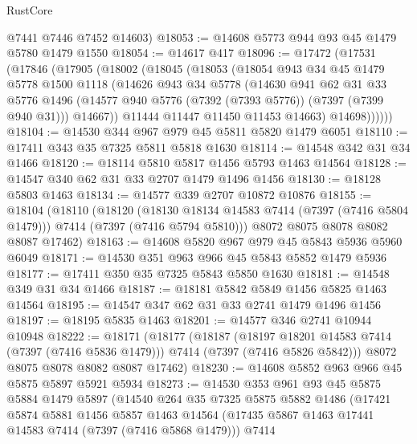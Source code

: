 \begin{lexlean}{RustCore}
\begin{coremodule}
      @7441
      @7446
      @7452
      @14603)
@18053 := @14608 @5773 @944 @93 @45 @1479 @5780 @1479 @1550
@18054 := @14617 @417
@18096 := @17472
    (@17531
      (@17846
        (@17905
          (@18002
            (@18045
              (@18053
                (@18054
                  @943
                  @34
                  @45
                  @1479
                  @5778
                  @1500
                  @1118
                  (@14626
                    @943
                    @34
                    @5778
                    (@14630
                      @941
                      @62
                      @31
                      @33
                      @5776
                      @1496
                      (@14577 @940 @5776 (@7392 (@7393 @5776)) (@7397 (@7399 @940 @31)))
                      @14667))
                  @11444
                  @11447
                  @11450
                  @11453
                  @14663)
                @14698))))))
@18104 := @14530 @344 @967 @979 @45 @5811 @5820 @1479 @6051
@18110 := @17411 @343 @35 @7325 @5811 @5818 @1630
@18114 := @14548 @342 @31 @34 @1466
@18120 := @18114 @5810 @5817 @1456 @5793 @1463 @14564
@18128 := @14547 @340 @62 @31 @33 @2707 @1479 @1496 @1456
@18130 := @18128 @5803 @1463
@18134 := @14577 @339 @2707 @10872 @10876
@18155 := @18104
    (@18110
      (@18120
        (@18130 @18134 @14583 @7414 (@7397 (@7416 @5804 @1479)))
        @7414
        (@7397 (@7416 @5794 @5810)))
      @8072
      @8075
      @8078
      @8082
      @8087
      @17462)
@18163 := @14608 @5820 @967 @979 @45 @5843 @5936 @5960 @6049
@18171 := @14530 @351 @963 @966 @45 @5843 @5852 @1479 @5936
@18177 := @17411 @350 @35 @7325 @5843 @5850 @1630
@18181 := @14548 @349 @31 @34 @1466
@18187 := @18181 @5842 @5849 @1456 @5825 @1463 @14564
@18195 := @14547 @347 @62 @31 @33 @2741 @1479 @1496 @1456
@18197 := @18195 @5835 @1463
@18201 := @14577 @346 @2741 @10944 @10948
@18222 := @18171
    (@18177
      (@18187
        (@18197 @18201 @14583 @7414 (@7397 (@7416 @5836 @1479)))
        @7414
        (@7397 (@7416 @5826 @5842)))
      @8072
      @8075
      @8078
      @8082
      @8087
      @17462)
@18230 := @14608 @5852 @963 @966 @45 @5875 @5897 @5921 @5934
@18273 := @14530
    @353
    @961
    @93
    @45
    @5875
    @5884
    @1479
    @5897
    (@14540
      @264
      @35
      @7325
      @5875
      @5882
      @1486
      (@17421
        @5874
        @5881
        @1456
        @5857
        @1463
        @14564
        (@17435 @5867 @1463 @17441 @14583 @7414 (@7397 (@7416 @5868 @1479)))
        @7414

\end{coremodule}
\end{lexlean}
